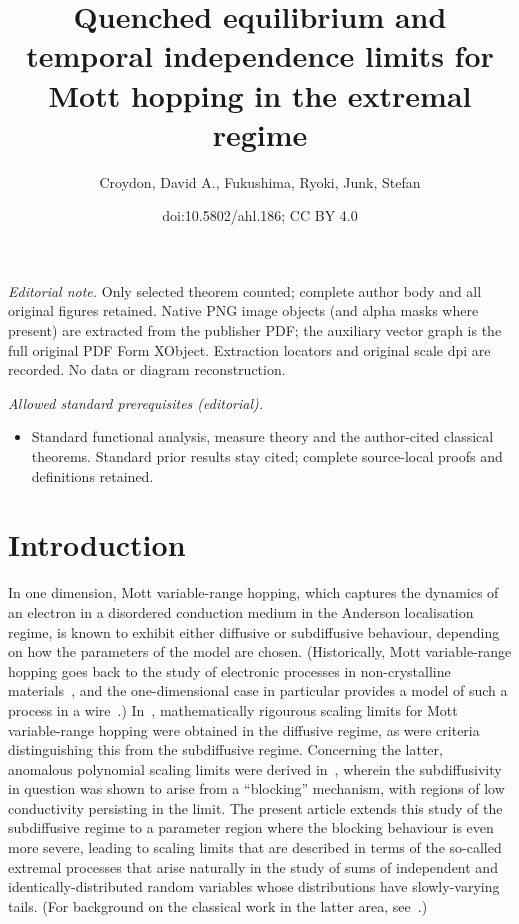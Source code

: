 \documentclass[10pt]{amsart}
\title{Quenched equilibrium and temporal independence limits for Mott hopping in the extremal regime}
\author{Croydon, David A., Fukushima, Ryoki, Junk, Stefan}
\date{doi:10.5802/ahl.186; CC BY 4.0}
\theoremstyle{definition}\newtheorem{defi}[theo]{Definition}\newtheorem{rema}[theo]{Remark}\newtheorem{exam}[theo]{Example}\newtheorem{exem}[theo]{Example}\newtheorem{nota}[theo]{Notation}
\begin{document}
\maketitle
\noindent\textit{Editorial note.} Only selected theorem counted; complete author body and all original figures retained. Native PNG image objects (and alpha masks where present) are extracted from the publisher PDF; the auxiliary vector graph is the full original PDF Form XObject. Extraction locators and original scale dpi are recorded. No data or diagram reconstruction.\par\medskip
\noindent\textit{Allowed standard prerequisites (editorial).}\begin{itemize}
\item Standard functional analysis, measure theory and the author-cited classical theorems. Standard prior results stay cited; complete source-local proofs and definitions retained.
\end{itemize}\medskip

\section{Introduction}\label{sec:intro}

In one dimension, Mott variable-range hopping, which captures the dynamics of an electron in a disordered conduction medium in the Anderson localisation regime, is known to exhibit either diffusive or subdiffusive behaviour, depending on how the parameters of the model are chosen. (Historically, Mott variable-range hopping goes back to the study of electronic processes in non-crystalline materials~\cite{Mott1, Mott2}, and the one-dimensional case in particular provides a model of such a process in a wire~\cite{Alex, Lee, Serota, Star}.) In~\cite{CF}, mathematically rigourous scaling limits for Mott variable-range hopping were obtained in the diffusive regime, as were criteria distinguishing this from the subdiffusive regime. Concerning the latter, anomalous polynomial scaling limits were derived in~\cite{CFJ}, wherein the subdiffusivity in question was shown to arise from a ``blocking'' mechanism, with regions of low conductivity persisting in the limit. The present article extends this study of the subdiffusive regime to a parameter region where the blocking behaviour is even more severe, leading to scaling limits that are described in terms of the so-called extremal processes that arise naturally in the study of sums of independent and identically-distributed random variables whose distributions have slowly-varying tails. (For background on the classical work in the latter area, see~\cite{Gnedenko, Lamperti, Res87}.)
\end{document}
